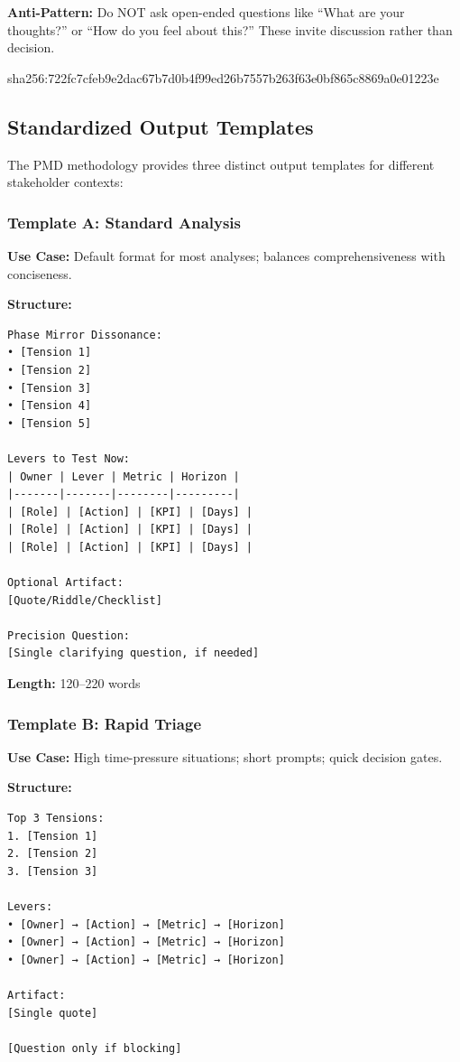 \documentclass[11pt,a4paper]{article}
\begin{document}
\textbf{Anti-Pattern:} Do NOT ask open-ended questions like ``What are your thoughts?'' or ``How do you feel about this?'' These invite discussion rather than decision.

sha256:722fc7cfeb9e2dac67b7d0b4f99ed26b7557b263f63e0bf865c8869a0e01223e

\subsection{Standardized Output Templates}

The PMD methodology provides three distinct output templates for different stakeholder contexts:

\subsubsection{Template A: Standard Analysis}

\textbf{Use Case:} Default format for most analyses; balances comprehensiveness with conciseness.

\textbf{Structure:}
\begin{verbatim}
Phase Mirror Dissonance:
• [Tension 1]
• [Tension 2]
• [Tension 3]
• [Tension 4]
• [Tension 5]

Levers to Test Now:
| Owner | Lever | Metric | Horizon |
|-------|-------|--------|---------|
| [Role] | [Action] | [KPI] | [Days] |
| [Role] | [Action] | [KPI] | [Days] |
| [Role] | [Action] | [KPI] | [Days] |

Optional Artifact:
[Quote/Riddle/Checklist]

Precision Question:
[Single clarifying question, if needed]
\end{verbatim}

\textbf{Length:} 120--220 words

\subsubsection{Template B: Rapid Triage}

\textbf{Use Case:} High time-pressure situations; short prompts; quick decision gates.

\textbf{Structure:}
\begin{verbatim}
Top 3 Tensions:
1. [Tension 1]
2. [Tension 2]
3. [Tension 3]

Levers:
• [Owner] → [Action] → [Metric] → [Horizon]
• [Owner] → [Action] → [Metric] → [Horizon]
• [Owner] → [Action] → [Metric] → [Horizon]

Artifact:
[Single quote]

[Question only if blocking]
\end{verbatim}
\end{document}
